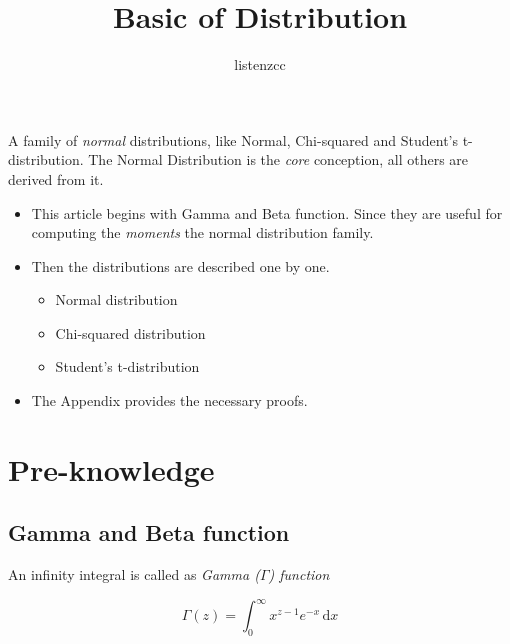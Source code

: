 \documentclass[a4paper]{article}
\title{Basic of Distribution}
\author{listenzcc}
\begin{document}

\maketitle

\abstract
A family of \emph{normal} distributions, like Normal, Chi-squared and Student's t-distribution.
The Normal Distribution is the \emph{core} conception, all others are derived from it.

\begin{itemize}
    \item This article begins with Gamma and Beta function.
          Since they are useful for computing the \emph{moments} the normal distribution family.
    \item Then the distributions are described one by one.
          \begin{itemize}
              \item Normal distribution
              \item Chi-squared distribution
              \item Student's t-distribution
          \end{itemize}
    \item The Appendix provides the necessary proofs.
\end{itemize}

\newpage

\tableofcontents

\newpage

\section{Pre-knowledge}

\subsection{Gamma and Beta function}

An infinity integral is called as \emph{Gamma ($\Gamma$) function}

\begin{equation}
    \Gamma(z) = \int_{0}^{\infty} x^{z-1} e^{-x} \,\mathrm{d}x
\end{equation}
\end{document}
